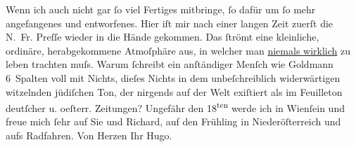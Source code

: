 \begin{ledgroupsized}[t]{13cm}
           \pstart
           Wenn ich auch nicht gar ſo viel Fertiges mitbringe, ſo dafür um ſo mehr angefangenes
               und entworfenes.\pend
           \pstart
           Hier iſt mir nach einer langen Zeit zuerſt die N. Fr.
                  Preſſe wieder in die Hände gekommen. Das ſtrömt eine kleinliche, ordinäre,
               herabgekommene Atmoſphäre {\pb}aus, in
               welcher man \uline{niemals wirklich} zu leben trachten
               muſs.\pend
           \pstart
           Warum ſchreibt ein anſtändiger
               Menſch wie Goldmann 6 Spalten voll mit Nichts,
               dieſes Nichts in dem unbeſchreiblich widerwärtigen witzelnden jüdiſchen Ton, der
               nirgends auf der Welt exiſtiert als im Feuilleton deutſcher u. oeſterr. Zeitungen? \pend
           \pstart
           {\pb}Ungefähr den 18\textsuperscript{ten} werde ich in Wienſein und freue mich ſehr auf Sie und Richard, auf den Frühling in Niederöſterreich und aufs Radfahren.\pend
           \pstart Von Herzen Ihr \spacefill\mbox{Hugo.}\pend{}
         
         \endnumbering{}\end{ledgroupsized}  \newcommand{\dateiname}{L01035}\newcommand{\titel}{Hugo von Hofmannsthal an Arthur Schnitzler, 6. 5. [1900]}\newcommand{\editorInnen}{Martin Anton Müller und Gerd-Hermann Susen}
      